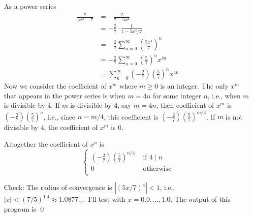 As a power series
\begin{align*}
\frac{2}{5x^4 - 7}
&= -\frac{2}{7 - 5x^4} \\
&= -\frac{2}{7} \cdot \frac{1}{1 - 5x^4/7} \\
&= -\frac{2}{7} \sum_{n=0}^\infty \left( \frac{5x^4}{7} \right)^n \\
&= -\frac{2}{7} \sum_{n=0}^\infty \left(\frac{5}{7}\right)^n x^{4n}
\\
&= \sum_{n=0}^\infty \left(-\frac{2}{7}\right) \left(\frac{5}{7}\right)^n x^{4n}
\end{align*}
Now we consider the coefficient of $x^m$ where $m \geq 0$ is an integer.
The only $x^m$ that appears in the power series is when $m = 4n$ for some integer $n$, i.e., when
$m$ is divisible by $4$.
If $m$ is divisible by $4$, say $m = 4n$, then coefficient of $x^m$ is 
$\displaystyle \left(-\frac{2}{7}\right) \left(\frac{5}{7}\right)^n$,
i.e., since
$n = m/4$, this coefficient is
$\displaystyle \left(-\frac{2}{7}\right) \left(\frac{5}{7}\right)^{m/4}$.
If $m$ is not divisible by $4$, the coefficient of $x^m$ is $0$.

Altogether the coefficient of $x^n$ is
\[
\begin{cases}
\displaystyle \left(-\frac{2}{7}\right) \left(\frac{5}{7}\right)^{n/4} & \text{ if } 4 \mid n \\
0 & \text{ otherwise} \\
\end{cases}
\]

Check:
The radius of convergence is $|(5x/7)^4| < 1$, i.e.,
$|x| < (7/5)^{1.4} \approx 1.0877...$.
I'll test with $x = 0.0, ..., 1.0$.
The output of this program
is
\qed
